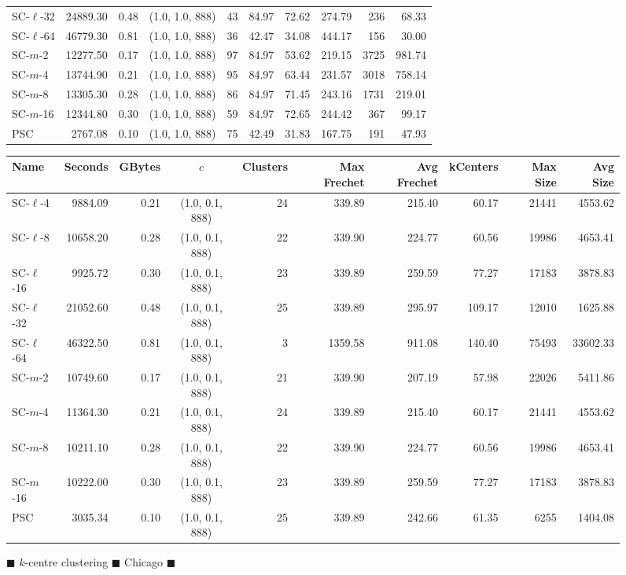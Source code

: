 \begin{figure}
\begin{center}
\begin{minipage}{\textwidth}
{\begin{tabular}{@{}lrrcrrrrrr@{}}
        SC-$\ell$-32 & 24889.30 & 0.48 & (1.0, 1.0, 888) & 43 & 84.97 & 72.62 & 274.79 & 236 & 68.33\\
        SC-$\ell$-64 & 46779.30 & 0.81 & (1.0, 1.0, 888) & 36 & 42.47 & 34.08 & 444.17 & 156 & 30.00\\
        SC-$m$-2 & 12277.50 & 0.17 & (1.0, 1.0, 888) & 97 & 84.97 & 53.62 & 219.15 & 3725 & 981.74\\
        SC-$m$-4 & 13744.90 & 0.21 & (1.0, 1.0, 888) & 95 & 84.97 & 63.44 & 231.57 & 3018 & 758.14\\
        SC-$m$-8 & 13305.30 & 0.28 & (1.0, 1.0, 888) & 86 & 84.97 & 71.45 & 243.16 & 1731 & 219.01\\
        SC-$m$-16 & 12344.80 & 0.30 & (1.0, 1.0, 888) & 59 & 84.97 & 72.65 & 244.42 & 367 & 99.17\\
        PSC & 2767.08 & 0.10 & (1.0, 1.0, 888) & 75 & 42.49 & 31.83 & 167.75 & 191 & 47.93 \\
        \bottomrule
    \end{tabular}}
    {
    \begin{tabular}{@{}lrrcrrrrrr@{}}
        \toprule
        Name & Seconds & GBytes & $c$ & Clusters & Max Frechet & Avg Frechet & kCenters & Max Size & Avg Size\\
        \midrule
        SC-$\ell$-4 & 9884.09 & 0.21 & (1.0, 0.1, 888) & 24 & 339.89 & 215.40 & 60.17 & 21441 & 4553.62\\
        SC-$\ell$-8 & 10658.20 & 0.28 & (1.0, 0.1, 888) & 22 & 339.90 & 224.77 & 60.56 & 19986 & 4653.41\\
        SC-$\ell$-16 & 9925.72 & 0.30 & (1.0, 0.1, 888) & 23 & 339.89 & 259.59 & 77.27 & 17183 & 3878.83\\
        SC-$\ell$-32 & 21052.60 & 0.48 & (1.0, 0.1, 888) & 25 & 339.89 & 295.97 & 109.17 & 12010 & 1625.88\\
        SC-$\ell$-64 & 46322.50 & 0.81 & (1.0, 0.1, 888) & 3 & 1359.58 & 911.08 & 140.40 & 75493 & 33602.33\\
        SC-$m$-2 & 10749.60 & 0.17 & (1.0, 0.1, 888) & 21 & 339.90 & 207.19 & 57.98 & 22026 & 5411.86\\
        SC-$m$-4 & 11364.30 & 0.21 & (1.0, 0.1, 888) & 24 & 339.89 & 215.40 & 60.17 & 21441 & 4553.62\\
        SC-$m$-8 & 10211.10 & 0.28 & (1.0, 0.1, 888) & 22 & 339.90 & 224.77 & 60.56 & 19986 & 4653.41\\
        SC-$m$-16 & 10222.00 & 0.30 & (1.0, 0.1, 888) & 23 & 339.89 & 259.59 & 77.27 & 17183 & 3878.83\\
        PSC & 3035.34 & 0.10 & (1.0, 0.1, 888) & 25 & 339.89 & 242.66 & 61.35 & 6255 & 1404.08 \\
        \bottomrule
    \end{tabular}}
\end{minipage}
\end{center} 
        \caption{$\blacksquare$ $k$-centre clustering $\blacksquare$ Chicago   $\blacksquare$}
    \end{figure}

